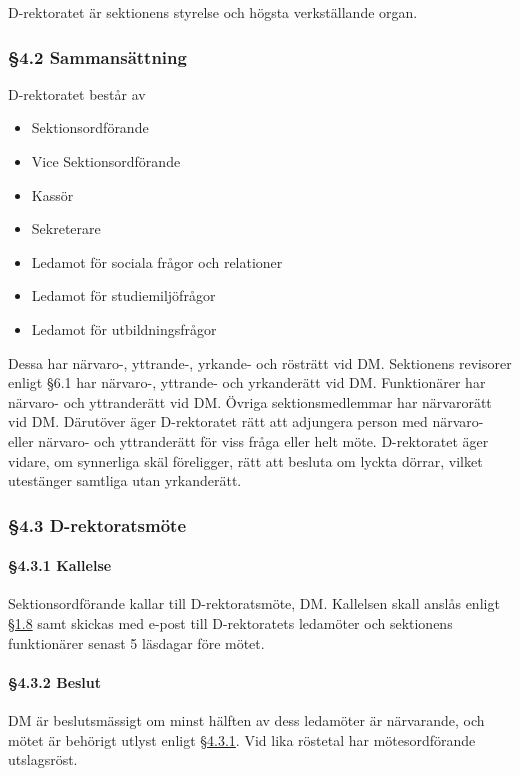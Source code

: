 D-rektoratet är sektionens styrelse och högsta verkställande organ.

\subsubsection{§4.2 Sammansättning}

D-rektoratet består av

\begin{itemize}
  \item Sektionsordförande
  \item Vice Sektionsordförande
  \item Kassör
  \item Sekreterare
  \item Ledamot för sociala frågor och relationer
  \item Ledamot för studiemiljöfrågor
  \item Ledamot för utbildningsfrågor
\end{itemize}

Dessa har närvaro-, yttrande-, yrkande- och rösträtt vid DM. Sektionens revisorer enligt §6.1 har närvaro-, yttrande- och yrkanderätt vid DM. Funktionärer har närvaro- och yttranderätt vid DM. Övriga sektionsmedlemmar har närvarorätt vid DM. Därutöver äger D-rektoratet rätt att adjungera person med närvaro- eller närvaro- och yttranderätt för viss fråga eller helt möte. D-rektoratet äger vidare, om synnerliga skäl föreligger, rätt att besluta om lyckta dörrar, vilket utestänger samtliga utan yrkanderätt.

\subsubsection{§4.3 D-rektoratsmöte}

\paragraph{§4.3.1 Kallelse}

Sektionsordförande kallar till D-rektoratsmöte, DM. Kallelsen skall anslås enligt \href{#officiella_informationskanaler}{§1.8} samt skickas med e-post till D-rektoratets ledamöter och sektionens funktionärer senast 5 läsdagar före mötet.

\paragraph{§4.3.2 Beslut}

DM är beslutsmässigt om minst hälften av dess ledamöter är närvarande, och mötet är behörigt utlyst enligt \href{#d-rektoratsmote}{§4.3.1}. Vid lika röstetal har mötesordförande utslagsröst.

